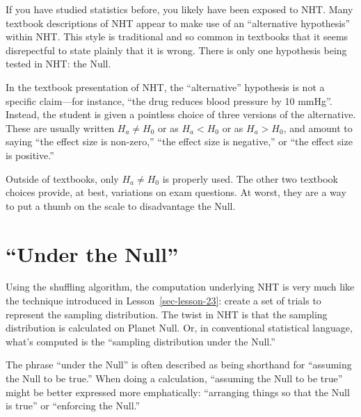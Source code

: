 \documentclass[
  letterpaper,
  DIV=11,
  numbers=noendperiod,
  oneside]{scrreprt}
\begin{document}
\begin{tcolorbox}[enhanced jigsaw, colbacktitle=quarto-callout-warning-color!10!white, breakable, opacitybacktitle=0.6, colback=white, left=2mm, arc=.35mm, colframe=quarto-callout-warning-color-frame, coltitle=black, toprule=.15mm, opacityback=0, leftrule=.75mm, bottomtitle=1mm, toptitle=1mm, titlerule=0mm, title=\textcolor{quarto-callout-warning-color}{\faExclamationTriangle}\hspace{0.5em}{Not an alternative!}, rightrule=.15mm, bottomrule=.15mm]

If you have studied statistics before, you likely have been exposed to
NHT. Many textbook descriptions of NHT appear to make use of an
``alternative hypothesis'' within NHT. This style is traditional and so
common in textbooks that it seems disrepectful to state plainly that it
is wrong. There is only one hypothesis being tested in NHT: the Null.

In the textbook presentation of NHT, the ``alternative'' hypothesis is
not a specific claim---for instance, ``the drug reduces blood pressure
by 10 mmHg''. Instead, the student is given a pointless choice of three
versions of the alternative. These are usually written \(H_a \neq H_0\)
or as \(H_a < H_0\) or as \(H_a > H_0\), and amount to saying ``the
effect size is non-zero,'' ``the effect size is negative,'' or ``the
effect size is positive.''

Outside of textbooks, only \(H_a \neq H_0\) is properly used. The other
two textbook choices provide, at best, variations on exam questions. At
worst, they are a way to put a thumb on the scale to disadvantage the
Null.

\end{tcolorbox}

\hypertarget{sec-under-the-null}{%
\section{``Under the Null''}\label{sec-under-the-null}}

Using the shuffling algorithm, the computation underlying NHT is very
much like the technique introduced in Lesson~\ref{sec-lesson-23}: create
a set of trials to represent the sampling distribution. The twist in NHT
is that the sampling distribution is calculated on Planet Null. Or, in
conventional statistical language, what's computed is the ``sampling
distribution under the Null.''

The phrase ``under the Null'' is often described as being shorthand for
``assuming the Null to be true.'' When doing a calculation, ``assuming
the Null to be true'' might be better expressed more emphatically:
``arranging things so that the Null is true'' or ``enforcing the Null.''
\end{document}
